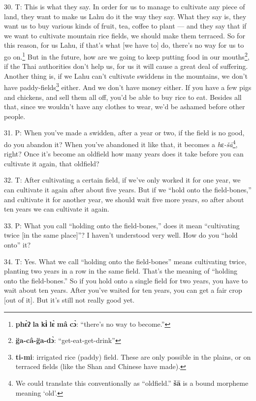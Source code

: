30. T: This is what they say. In order for us to manage to cultivate any piece
of land, they want to make us Lahu do it the way they say. What they say is, they
want us to buy various kinds of fruit, tea, coffee to plant --- and they say that
if we want to cultivate mountain rice fields, we should make them terraced. So
for this reason, for us Lahu, if that's what [we have to] do, there's no way for
us to go on.\footnote{\textbf{phɛ̀ʔ} \textbf{la} \textbf{kɨ̀} \textbf{lɛ̀} \textbf{mâ} \textbf{cɔ̀}: ``there's no way to become.''} But in the future, how are we going to keep putting food in our
mouths\footnote{\textbf{g̈a-câ-g̈a-dɔ̀}: ``get-eat-get-drink''}, if the Thai authorities don't help us, for us it will cause a great
deal of suffering. Another thing is, if we Lahu can't cultivate swiddens in the
mountains, we don't have paddy-fields\footnote{\textbf{ti-mi}: irrigated rice (paddy) field. These are only possible in the plains, or on terraced fields (like the Shan and Chinese have made).} either. And we don't have money either.
If you have a few pigs and chickens, and sell them all off, you'd be able to buy
rice to eat. Besides all that, since we wouldn't have any clothes to wear, we'd
be ashamed before other people.

31. P: When you've made a swidden, after a year or two, if the field is no good,
do you abandon it? When you've abandoned it like that, it becomes a \textit{h}ɛ\textit{-šā}\footnote{We could translate this conventionally as ``oldfield.'' \textbf{šā} is a bound morpheme meaning `old'.},
right? Once it's become an oldfield how many years does it take before you can
cultivate it again, that oldfield?

32. T: After cultivating a certain field, if we've only worked it for one year,
we can cultivate it again after about five years. But if we ``hold onto the field-bones,''
and cultivate it for another year, we should wait five more years, so after about
ten years we can cultivate it again.

33. P: What you call ``holding onto the field-bones,'' does it mean ``cultivating
twice [in the same place]''? I haven't understood very well. How do you ``hold
onto'' it?

34. T: Yes. What we call ``holding onto the field-bones'' means cultivating twice,
planting two years in a row in the same field. That's the meaning of ``holding
onto the field-bones.'' So if you hold onto a single field for two years, you have
to wait about ten years. After you've waited for ten years, you can get a fair
crop [out of it]. But it's still not really good yet.

